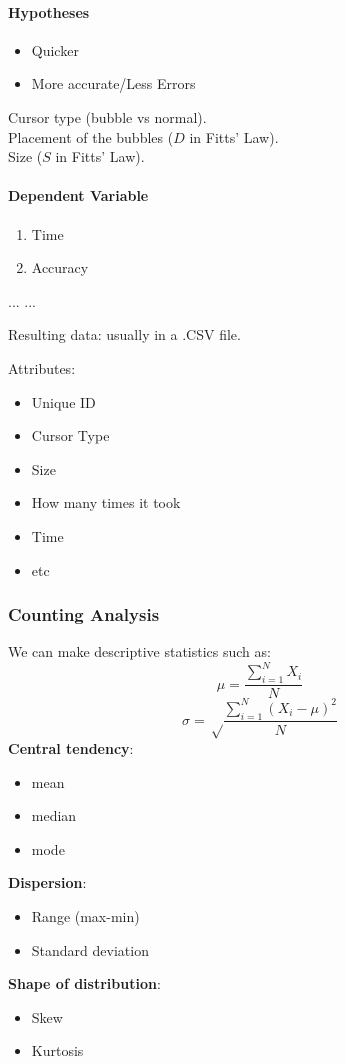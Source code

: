 \paragraph{Hypotheses}
\begin{itemize}
    \item Quicker
    \item More accurate/Less Errors
\end{itemize}
Cursor type (bubble vs normal).\\
Placement of the bubbles ($D$ in Fitts' Law).\\
Size ($S$ in Fitts' Law).

\paragraph{Dependent Variable}
\begin{enumerate}
    \item Time
    \item Accuracy
\end{enumerate}

...
...

Resulting data: usually in a .CSV file.

Attributes:
\begin{itemize}
    \item Unique ID
    \item Cursor Type
    \item Size
    \item How many times it took
    \item Time
    \item etc
\end{itemize}

\subsubsection{Counting Analysis}
We can make descriptive statistics such as:
\[
    \mu = \frac{\sum_{i=1}^N X_i}N
\]
\[
    \sigma = \sqrt\frac{\sum_{i=1}^N (X_i-\mu)^2}N
\]
\textbf{Central tendency}:
\begin{itemize}
    \item mean
    \item median
    \item mode
\end{itemize}
\textbf{Dispersion}:
\begin{itemize}
    \item Range (max-min)
    \item Standard deviation
\end{itemize}
\textbf{Shape of distribution}:
\begin{itemize}
    \item Skew
    \item Kurtosis
\end{itemize}

